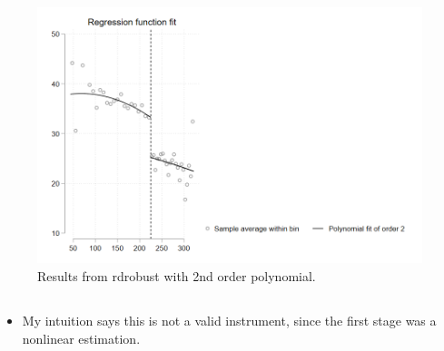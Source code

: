 \documentclass{article}
\begin{document}
\begin{figure}[htbp]
    \centering
    \includegraphics[scale=.5]{homework6/output/rd_stata.png}
    \caption{Results from rdrobust with 2nd order polynomial.}
    \label{fig:figure5}
\end{figure}

\subsection{}
\begin{itemize}
    \item My intuition says this is not a valid instrument, since the first stage was a nonlinear estimation. 
\end{itemize}
\end{document}
